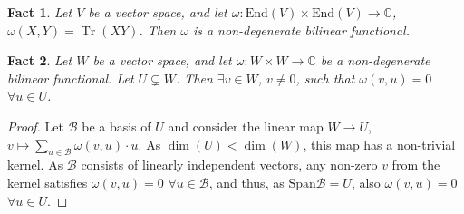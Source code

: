 \documentclass{article}
\newtheorem{fact}{Fact}
\newcommand{\tr}{\operatorname{Tr}}
\newcommand{\End}{\mathrm{End}}
\newcommand{\Span}{\mathrm{Span}}
\begin{document}
\begin{fact}\label{fact:tr_nondegen}
  Let $V$ be a vector space, and let $\omega: \End(V)\times\End(V)\to \mathbb{C}$, $\omega(X,Y)= \tr(XY)$. Then $\omega$ is a non-degenerate bilinear functional.
\end{fact}


\begin{fact}
  Let $W$ be a vector space, and let $\omega: W\times W\to \mathbb{C}$ be a non-degenerate bilinear functional. Let $U\subsetneq W$. Then $\exists v\in W$, $v\neq 0$, such that  $\omega(v,u) =0$ $\forall u\in U$.
\end{fact}

\begin{proof}
   Let $\mathcal{B}$ be a basis of $U$ and consider the linear map $W\to U$, $v \mapsto \sum_{u\in \mathcal{B}} \omega(v,u) \cdot u$. As $\dim(U) < \dim(W)$, this map has a non-trivial kernel. As $\mathcal{B}$ consists of linearly independent vectors, any non-zero $v$ from the kernel satisfies $\omega(v,u) = 0$ $\forall u\in\mathcal{B}$, and thus, as $\Span \mathcal{B} = U$, also $\omega(v,u) = 0$ $\forall u \in U$.
    
\end{proof}
\end{document}
